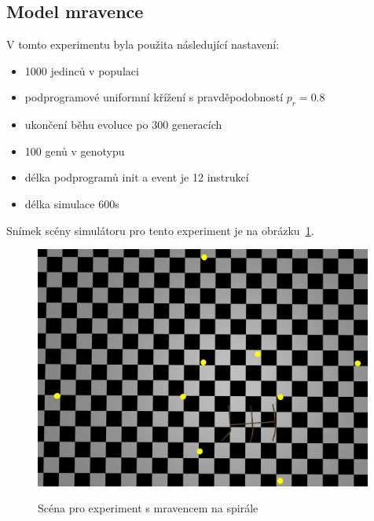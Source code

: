 \subsection{Model mravence}

V tomto experimentu byla použita následující nastavení:
\begin{itemize}
    \item 1000 jedinců v populaci
    \item podprogramové uniformní křížení s pravděpodobností $p_r = 0.8$
    \item ukončení běhu evoluce po 300 generacích
    \item 100 genů v genotypu
    \item délka podprogramů init a event je 12 instrukcí
    \item délka simulace 600s
\end{itemize}

Snímek scény simulátoru pro tento experiment je na obrázku~\ref{fig:mravenec_spirala_zhora}.
\begin{figure}[h]
    \centering
    {\includegraphics[width=30em]{obrazky/mravenec_spirala_zhora.png}}
    \caption{
    Scéna pro experiment s mravencem na spirále
    }
    \label{fig:mravenec_spirala_zhora}
\end{figure}


